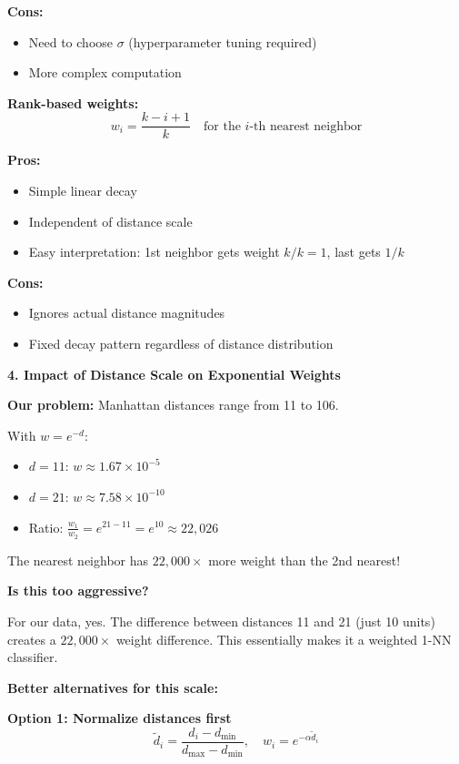 \documentclass[12pt]{article}
\begin{document}
\begin{explanation}
\textbf{Cons:}
\begin{itemize}
    \item Need to choose \(\sigma\) (hyperparameter tuning required)
    \item More complex computation
\end{itemize}

\textbf{Rank-based weights:}
\[
w_i = \frac{k - i + 1}{k} \quad \text{for the } i\text{-th nearest neighbor}
\]

\textbf{Pros:}
\begin{itemize}
    \item Simple linear decay
    \item Independent of distance scale
    \item Easy interpretation: 1st neighbor gets weight \(k/k = 1\), last gets \(1/k\)
\end{itemize}

\textbf{Cons:}
\begin{itemize}
    \item Ignores actual distance magnitudes
    \item Fixed decay pattern regardless of distance distribution
\end{itemize}

\textbf{4. Impact of Distance Scale on Exponential Weights}

\textbf{Our problem:} Manhattan distances range from 11 to 106.

With \(w = e^{-d}\):
\begin{itemize}
    \item \(d = 11\): \(w \approx 1.67 \times 10^{-5}\)
    \item \(d = 21\): \(w \approx 7.58 \times 10^{-10}\)
    \item Ratio: \(\frac{w_1}{w_2} = e^{21-11} = e^{10} \approx 22,026\)
\end{itemize}

The nearest neighbor has \(22,000\times\) more weight than the 2nd nearest!

\textbf{Is this too aggressive?}

For our data, yes. The difference between distances 11 and 21 (just 10 units) creates a \(22,000\times\) weight difference. This essentially makes it a weighted 1-NN classifier.

\textbf{Better alternatives for this scale:}

\textbf{Option 1: Normalize distances first}
\[
\tilde{d}_i = \frac{d_i - d_{\min}}{d_{\max} - d_{\min}}, \quad w_i = e^{-\alpha \tilde{d}_i}
\]


\end{explanation}
\end{document}
